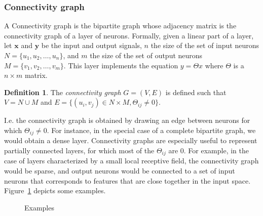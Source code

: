 \documentclass{article}
\theoremstyle{definition}
\newtheorem{definition}{Definition}[section]
\begin{document}
\subsubsection{Connectivity graph}
\label{con_graph}

A Connectivity graph is the bipartite graph whose adjacency matrix is the connectivity graph of a layer of neurons.
Formally, given a linear part of a layer, let $\textbf{x}$ and $\textbf{y}$ be the input and output signals, $n$ the size of the set of input neurons $N = \{u_1, u_2, \ldots, u_n\}$, and $m$ the size of the set of output neurons $M = \{v_1, v_2, \ldots, v_m\}$. This layer implements the equation $y = \Theta x$ where $\Theta$ is a $n \times m$ matrix.

\begin{definition}
{The \emph{connectivity graph} $G = (V,E)$ is defined such that $V = N \cup M$ and $E = \{(u_i,v_j) \in  N \times M, \Theta_{ij} \neq 0 \} $.}
\end{definition}

I.e. the connectivity graph is obtained by drawing an edge between neurons for which $\Theta_{ij} \neq 0$.
For instance, in the special case of a complete bipartite graph, we would obtain a dense layer. 
Connectivity graphs are especially useful to represent partially connected layers, for which most of the $\Theta_{ij}$ are $0$. 
For example, in the case of layers characterized by a small local receptive field, the connectivity graph would be sparse, and output neurons would be connected to a set of input neurons that corresponds to features that are close together in the input space. Figure~\ref{con_ex} depicts some examples.

\begin{figure}[h]
  \begin{center}
  \end{center}
  \caption{Examples}
  \label{con_ex}
\end{figure}
\end{document}
